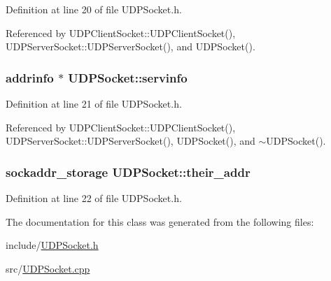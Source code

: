 Definition at line 20 of file U\+D\+P\+Socket.\+h.



Referenced by U\+D\+P\+Client\+Socket\+::\+U\+D\+P\+Client\+Socket(), U\+D\+P\+Server\+Socket\+::\+U\+D\+P\+Server\+Socket(), and U\+D\+P\+Socket().

\hypertarget{classUDPSocket_ae0c699a5dbc10580cd2844f282e61f4d}{
\subsubsection[{servinfo}]{\setlength{\rightskip}{0pt plus 5cm}addrinfo $\ast$ U\+D\+P\+Socket\+::servinfo\hspace{0.3cm}{\ttfamily [protected]}}}\label{classUDPSocket_ae0c699a5dbc10580cd2844f282e61f4d}


Definition at line 21 of file U\+D\+P\+Socket.\+h.



Referenced by U\+D\+P\+Client\+Socket\+::\+U\+D\+P\+Client\+Socket(), U\+D\+P\+Server\+Socket\+::\+U\+D\+P\+Server\+Socket(), U\+D\+P\+Socket(), and $\sim$\+U\+D\+P\+Socket().

\hypertarget{classUDPSocket_aee1dffc42ebe31dd0400b78d782978de}{
\subsubsection[{their\+\_\+addr}]{\setlength{\rightskip}{0pt plus 5cm}sockaddr\+\_\+storage U\+D\+P\+Socket\+::their\+\_\+addr\hspace{0.3cm}{\ttfamily [protected]}}}\label{classUDPSocket_aee1dffc42ebe31dd0400b78d782978de}


Definition at line 22 of file U\+D\+P\+Socket.\+h.



The documentation for this class was generated from the following files\+:\begin{DoxyCompactItemize}
\item 
include/\hyperlink{UDPSocket_8h}{U\+D\+P\+Socket.\+h}\item 
src/\hyperlink{UDPSocket_8cpp}{U\+D\+P\+Socket.\+cpp}\end{DoxyCompactItemize}
